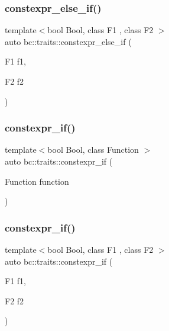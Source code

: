 \mbox{\label{namespacebc_1_1traits_a28fc737e50096740cbbbacb6e45fcb41}} 
\subsubsection{\texorpdfstring{constexpr\+\_\+else\+\_\+if()}{constexpr\_else\_if()}\hspace{0.1cm}{\footnotesize\ttfamily [2/2]}}
{\footnotesize\ttfamily template$<$bool Bool, class F1 , class F2 $>$ \\
auto bc\+::traits\+::constexpr\+\_\+else\+\_\+if (\begin{DoxyParamCaption}\item[{F1}]{f1,  }\item[{F2}]{f2 }\end{DoxyParamCaption})}

\mbox{\label{namespacebc_1_1traits_ab6293ec3371433ca2f273e02f72aa70e}} 
\subsubsection{\texorpdfstring{constexpr\+\_\+if()}{constexpr\_if()}\hspace{0.1cm}{\footnotesize\ttfamily [1/2]}}
{\footnotesize\ttfamily template$<$bool Bool, class Function $>$ \\
auto bc\+::traits\+::constexpr\+\_\+if (\begin{DoxyParamCaption}\item[{Function}]{function }\end{DoxyParamCaption})}

\mbox{\label{namespacebc_1_1traits_a60d74848292fcb1b276f776b66727e92}} 
\subsubsection{\texorpdfstring{constexpr\+\_\+if()}{constexpr\_if()}\hspace{0.1cm}{\footnotesize\ttfamily [2/2]}}
{\footnotesize\ttfamily template$<$bool Bool, class F1 , class F2 $>$ \\
auto bc\+::traits\+::constexpr\+\_\+if (\begin{DoxyParamCaption}\item[{F1}]{f1,  }\item[{F2}]{f2 }\end{DoxyParamCaption})}

